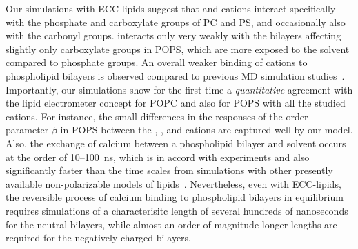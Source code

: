 Our simulations with ECC-lipids suggest that
 and  cations
interact specifically with the phosphate and carboxylate groups of PC and PS, 
and occasionally also with the carbonyl groups. 
 interacts only very weakly with the bilayers
affecting slightly only carboxylate groups in POPS,
which are more exposed to the solvent compared to phosphate groups. 
An overall weaker binding of cations to phospholipid bilayers is observed 
compared to previous MD simulation studies~\citep{nmrlipids_proj4, catte16, bockmann03, bockmann04, melcrova16, javanainen17}. 
Importantly,
our simulations show for the first time a \emph{quantitative} agreement with the lipid electrometer concept
for POPC and also for POPS with all the studied cations. 
For instance, the small differences 
in the responses of the order parameter $\beta$ in POPS
between the 
, , and  cations
are captured well by our model. 
Also, the exchange of calcium between a phospholipid bilayer and solvent 
occurs at the order of 10--100~ns, 
which is in accord with experiments and also 
significantly faster than the time scales from simulations 
with other presently available non-polarizable models of lipids~\citep{melcrova16, javanainen17, catte16}. 
Nevertheless, even with ECC-lipids,
the reversible process of calcium binding to phospholipid bilayers in equilibrium
requires simulations of a characterisitc length of several hundreds of nanoseconds 
for the neutral bilayers,
while almost an order of magnitude longer lengths 
are required for the negatively charged bilayers. 


